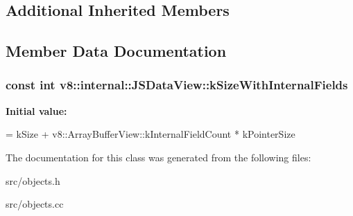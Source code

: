 \subsection*{Additional Inherited Members}


\subsection{Member Data Documentation}
\hypertarget{classv8_1_1internal_1_1_j_s_data_view_a6966ba668404b7e75b9152dac18fc800}{}
\subsubsection[{k\+Size\+With\+Internal\+Fields}]{\setlength{\rightskip}{0pt plus 5cm}const int v8\+::internal\+::\+J\+S\+Data\+View\+::k\+Size\+With\+Internal\+Fields\hspace{0.3cm}{\ttfamily [static]}}\label{classv8_1_1internal_1_1_j_s_data_view_a6966ba668404b7e75b9152dac18fc800}
{\bfseries Initial value\+:}
\begin{DoxyCode}
=
      kSize + v8::ArrayBufferView::kInternalFieldCount * kPointerSize
\end{DoxyCode}


The documentation for this class was generated from the following files\+:\begin{DoxyCompactItemize}
\item 
src/objects.\+h\item 
src/objects.\+cc\end{DoxyCompactItemize}

